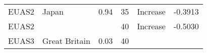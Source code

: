 \documentclass[]{article}
\begin{document}
\begin{longtable}[]{@{}clrccr@{}}
\begin{minipage}[t]{0.08\columnwidth}
EUAS2\strut
\end{minipage} & \begin{minipage}[t]{0.29\columnwidth}\raggedright\strut
Japan\strut
\end{minipage} & \begin{minipage}[t]{0.11\columnwidth}\raggedleft\strut
0.94\strut
\end{minipage} & \begin{minipage}[t]{0.10\columnwidth}\centering\strut
35\strut
\end{minipage} & \begin{minipage}[t]{0.16\columnwidth}\centering\strut
Increase\strut
\end{minipage} & \begin{minipage}[t]{0.09\columnwidth}\raggedleft\strut
-0.3913\strut
\end{minipage}\tabularnewline
\begin{minipage}[t]{0.08\columnwidth}\centering\strut
EUAS2\strut
\end{minipage} & \begin{minipage}[t]{0.29\columnwidth}\raggedright\strut
\strut
\end{minipage} & \begin{minipage}[t]{0.11\columnwidth}\raggedleft\strut
\strut
\end{minipage} & \begin{minipage}[t]{0.10\columnwidth}\centering\strut
40\strut
\end{minipage} & \begin{minipage}[t]{0.16\columnwidth}\centering\strut
Increase\strut
\end{minipage} & \begin{minipage}[t]{0.09\columnwidth}\raggedleft\strut
-0.5030\strut
\end{minipage}\tabularnewline
\begin{minipage}[t]{0.08\columnwidth}\centering\strut
EUAS3\strut
\end{minipage} & \begin{minipage}[t]{0.29\columnwidth}\raggedright\strut
Great Britain\strut
\end{minipage} & \begin{minipage}[t]{0.11\columnwidth}\raggedleft\strut
0.03\strut
\end{minipage} & \begin{minipage}[t]{0.10\columnwidth}\centering\strut
40\strut
\end{minipage} & \begin{minipage}[t]{0.16\columnwidth}\centering\strut

\end{minipage}
\end{longtable}
\end{document}

